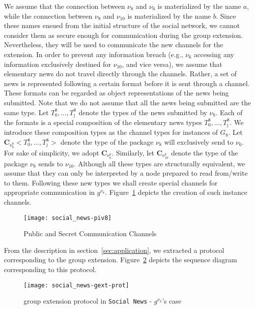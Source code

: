 We assume that the connection between $\nu_8$ and $\nu_6$ is materialized by the name $a$, while the connection between
$\nu_8$ and $\nu_{10}$ is materialized by the name $b$. Since these names ensued from the initial structure of the social
network, we cannot consider them as secure enough for communication during the group extension. Nevertheless, they will
be used to communicate the new channels for the extension. In order to prevent any information breach (e.g., $\nu_6$
accessing any information exclusively destined for $\nu_{10}$, and vice versa), we assume that elementary news do not
travel directly through the channels. Rather, a set of news is represented following a certain format before it is sent
through a channel. These formats can be regarded as object representations of the news being submitted. Note that we do
not assume that all the news being submitted are the same type. Let $T_0^8,\ldots,T_\jmath^8$ denote the types of the
news submitted by $\nu_8$. Each of the formats is a special composition of the elementary news types
$T_0^8,\ldots,T_\jmath^8$. We introduce these composition types as the channel types for instances of $G_8$. Let
$\mathbf{C}_{\nu_6^8}<T_0^8,\ldots,T_\jmath^8>$ denote the type of the package $\nu_8$ will exclusively send to $\nu_6$.
For sake of simplicity, we adopt $\mathbf{C}_{\nu_6^8}$. Similarly, let $\mathbf{C}_{\nu_{10}^8}$ denote the type of the
package $\nu_8$ sends to $\nu_{10}$. Although all these types are structurally equivalent, we assume that they can only
be interpreted by a node prepared to read from/write to them. Following these new types we shall create special channels
for appropriate communication in $g^{\nu_8}$. Figure~\ref{fig:sn-news-v8-channels} depicts the creation of such instance
channels.

\begin{figure}
	\centering 
	\texttt{[image: social\_news-piv8]} 
	\caption{Public and Secret Communication Channels} 
	\label{fig:sn-news-v8-channels} 
\end{figure}

From the description in section~\ref{sec:application}, we extracted a protocol corresponding to the group extension.
Figure~\ref{fig:subgextprot} depicts the sequence diagram corresponding to this protocol.
\begin{figure}
	\centering 
	\texttt{[image: social\_news-gext-prot]} 
	\caption{group extension protocol in {\tt Social News} - $g^{\nu_8}$'s case} 
	\label{fig:subgextprot} 
\end{figure}

